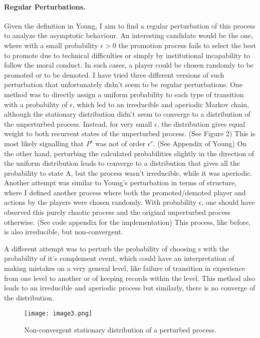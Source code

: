 \documentclass[11pt, a4paper, leqno]{article}
\begin{document}
\paragraph{Regular Perturbations.}
Given the definition in Young, I aim to find a regular perturbation of this process to analyze the asymptotic behaviour. An interesting candidate  would be the one, where with a small probability $\epsilon > 0$ the promotion process fails to select the best to promote due to technical difficulties or simply by institutional incapability to follow the moral conduct. In such cases, a player could be chosen randomly to be promoted or to be demoted. I have tried three different versions of such perturbation that unfortunately didn't seem to be regular perturbations. One method was to directly assign a uniform probability to each type of transition with a probability of $\epsilon$, which led to an irreducible and aperiodic Markov chain, although the stationary distribution didn't seem to converge to a distribution of the unperturbed process. Instead, for very small $\epsilon$, the distribution gives equal weight to both recurrent states of the unperturbed process. (See Figure 2) This is most likely signalling that $P^\epsilon$ was not of order $\epsilon^r$. (See Appendix of Young) On the other hand, perturbing the calculated probabilities slightly in the direction of the uniform distribution leads to converge to a distribution that gives all the probability to state A, but the process wasn't irreducible, while it was aperiodic. Another attempt was similar to Young's perturbation in terms of structure, where I defined another process where both the promoted/demoted player and actions by the players were chosen randomly. With probability $\epsilon$, one should have observed this purely chaotic process and the original unperturbed process otherwise. (See code appendix for the implementation) This process, like before, is also irreducible, but non-convergent.

A different attempt was to perturb the probability of choosing s with the probability of it's complement event, which could have an interpretation of making mistakes on a very general level, like failure of transition in experience from one level to another or of keeping records within the level. This method also leads to an irreducible and aperiodic process but similarly, there is no converge of the distribution.

\begin{figure}
    \centering
    \texttt{[image: image3.png]}
    \caption{Non-convergent stationary distribution of a perturbed process.}
\end{figure}
\end{document}
